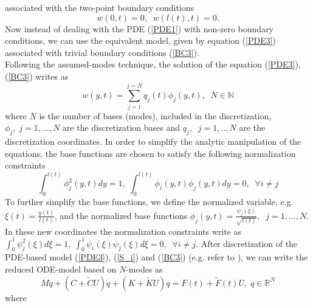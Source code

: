 \documentclass[letterpaper, 11 pt, conference]{ieeeconf}
\begin{document}
 associated with the two-point boundary conditions
\begin{equation}\label{BC3}
w(0,t)=0,\;\;w(l(t),t)=0.
\end{equation}
Now instead of dealing with the PDE (\ref{PDE1}) with non-zero
boundary conditions, we can use the equivalent model, given by
equation (\ref{PDE3}) associated
with trivial boundary conditions (\ref{BC3}).\\
 Following the assumed-modes technique, the solution of the equation
 (\ref{PDE3}), (\ref{BC3}) writes as
 \begin{equation}\label{discretization_1}
w(y,t)=\sum_{j=1}^{j=N}q_{j}(t)\phi_{j}(y,t),\;\;N\in\mathbb{N}
 \end{equation}
 where $N$ is the number of bases (modes), included in the
 discretization, $\phi_{j},\;j=1,...,N$ are the discretization
 bases and $q_{j},\;\;j=1,..,N$ are the discretization
 coordinates. In order to simplify the analytic manipulation of
 the equations, the base functions are chosen to satisfy the
 following normalization constraints
 \small\begin{equation}\label{normalization_1}
\int_{0}^{l(t)}\phi_{j}^{2}(y,t)dy=1,\;
\int_{0}^{l(t)}\phi_{i}(y,t)\phi_{j}(y,t)dy=0,\;\;\forall i\neq j
 \end{equation}
 To further simplify the base functions, we define the normalized
 variable, e.g. \cite{ZC06,ZX03}
$\xi(t)=\frac{y(t)}{l(t)}$,
and the normalized base functions
$\phi_{j}(y,t)=\frac{\psi_{j}(\xi)}{\sqrt{l(t)}},\;\;j=1,...,N$.
In these new coordinates the normalization constraints write as
$\int_{0}^{1}\psi_{j}^{2}(\xi)d\xi=1,\;
\int_{0}^{1}\psi_{i}(\xi)\psi_{j}(\xi)d\xi=0,\;\;\forall i\neq j$.
After discretization of the PDE-based model (\ref{PDE3}),
(\ref{S_i}) and (\ref{BC3}) (e.g. refer to \cite{ZX03}), we can
write the reduced ODE-model based on $N$-modes as
\begin{equation}\label{ODE_model}
M\ddot{q}+(C+\tilde{C}U)\dot{q}+(K+\tilde{K}
U)q=F(t)+\tilde{F}(t)U,\;q\in\mathbb{R}^{N}
\end{equation}
where
\end{document}
